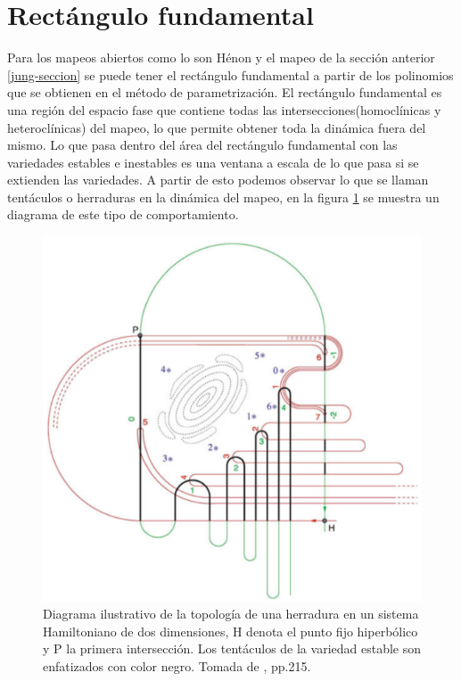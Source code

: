 \label{SeccionRectanguloFundamental}\section{Rectángulo fundamental}
Para los mapeos abiertos como lo son Hénon y el mapeo de la sección anterior \ref{jung-seccion} se puede tener el rectángulo fundamental a partir de los polinomios que se obtienen en el método de parametrización. El rectángulo fundamental es una región del espacio fase que contiene todas las intersecciones(homoclínicas y heteroclínicas) del mapeo, lo que permite obtener toda la dinámica fuera del mismo. Lo que pasa dentro del área del rectángulo fundamental con las variedades estables e inestables es una ventana a escala de lo que pasa si se extienden las variedades. A partir de esto podemos observar lo que se llaman tentáculos o herraduras en la dinámica del mapeo, en la figura \ref{herradura} se muestra un diagrama de este tipo de comportamiento.

\begin{figure}[H]
\centering
\includegraphics[scale=0.25]{herradura}
\caption{Diagrama ilustrativo de la topología de una herradura en un sistema Hamiltoniano de dos dimensiones, H denota el punto fijo hiperbólico y P la primera intersección. Los tentáculos de la variedad estable son enfatizados con color negro. Tomada de \cite{Ying}, pp.215.}
\label{herradura}
\end{figure}


